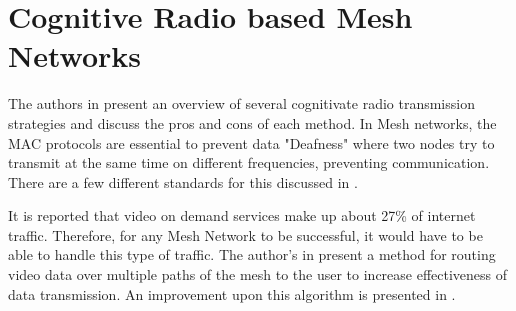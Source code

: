 \section{Cognitive Radio based Mesh Networks}

The authors in \cite{5457862} present an overview of several cognitivate radio transmission strategies and discuss the pros and cons of each method. 
In Mesh networks, the MAC protocols are essential to prevent data "Deafness" where two nodes try to
transmit at the same time on different frequencies, preventing communication. There are a few 
different standards for this discussed in \cite{6392009}.

It is reported that video on demand services make up about 27\% of internet traffic. Therefore,
for any Mesh Network to be successful, it would have to be able to handle this type of traffic. The
author's in \cite{6112757} present a method for routing video data over multiple paths of the mesh
to the user to increase effectiveness of data transmission. An improvement upon this algorithm
is presented in \cite{6778761}. 
